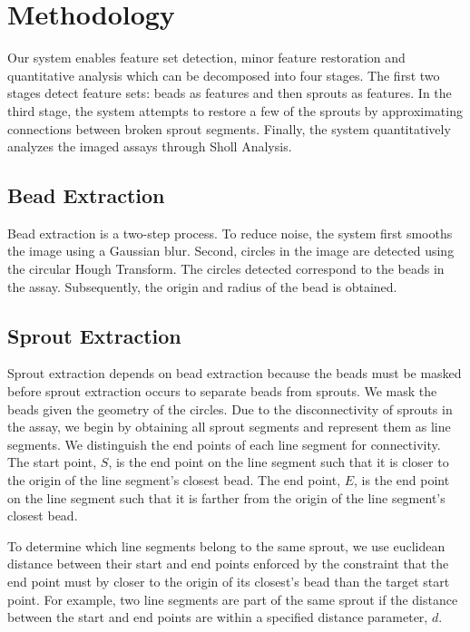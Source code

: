 \documentclass{sig-alternate}
\begin{document}
\section{Methodology} %
\label{sec:Methodology}
	Our system enables feature set detection, minor feature restoration and
	quantitative analysis which can be decomposed into four stages. The
	first two stages detect feature sets: beads as features and then
	sprouts as features. In the third stage, the system attempts to restore
	a few of the sprouts by approximating connections between broken sprout
	segments. Finally, the system quantitatively analyzes the imaged assays
	through Sholl Analysis.

	\subsection{Bead Extraction} %
	\label{sub:Bead Extraction}
		Bead extraction is a two-step process. To reduce noise, the system
		first smooths the image using a Gaussian blur. Second, circles in
		the image are detected using the circular Hough Transform. The
		circles detected correspond to the beads in the assay.
		Subsequently, the origin and radius of the bead is obtained.

	\subsection{Sprout Extraction} %
	\label{sub:Sprout Extraction}
		Sprout extraction depends on bead extraction because the beads must be
		masked before sprout extraction occurs to separate beads from sprouts.
		We mask the beads given the geometry of the circles. Due to the
		disconnectivity of sprouts in the assay, we begin by obtaining all
		sprout segments and represent them as line segments. We distinguish the
		end points of each line segment for connectivity. The start point, $S$,
		is the end point on the line segment such that it is closer to the
		origin of the line segment's closest bead. The end point, $E$, is the
		end point on the line segment such that it is farther from the origin
		of the line segment's closest bead.

		To determine which line segments belong to the same sprout, we use
		euclidean distance between their start and end points enforced by
		the constraint that the end point must by closer to the origin of
		its closest's bead than the target start point. For example, two
		line segments are part of the same sprout if the distance between
		the start and end points are within a specified distance parameter,
		$d$.
\end{document}
